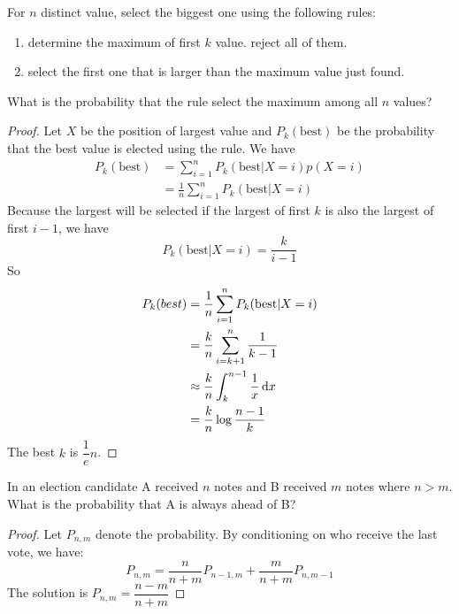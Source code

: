 \begin{example}
    For $n$ distinct value, select the biggest one using the following rules:
    \begin{enumerate}
        \item determine the maximum of first $k$ value. reject all of them.
        \item select the first one that is larger than the maximum value just found.
    \end{enumerate}
    What is the probability that the rule select the maximum among all $n$ values?
\end{example}
\begin{proof}
    Let $X$ be the position of largest value and $P_k(\text{best})$ be the probability that the best value is elected using the rule. We have
    \begin{equation*}
        \begin{aligned}
            P_k (\text{best}) &= \sum_{i=1}^n P_k (\text{best} | X = i) p(X=i) \\
            &= \frac{1}{n} \sum_{i=1}^n P_k (\text{best}|X=i)
        \end{aligned}
    \end{equation*}
    Because the largest will be selected if the largest of first $k$ is also the largest of first $i-1$, we have
    \begin{equation*}
        P_k(\text{best} | X=i) = \frac{k}{i-1}
    \end{equation*}
    So
    \begin{equation*}
        \begin{aligned}
            P_k(best) &= \frac{1}{n} \sum_{i=1}^n P_k (\text{best}|X=i) \\
            &= \frac{k}{n} \sum_{i=k+1}^n \frac{1}{k-1} \\
            &\approx \frac{k}{n} \int_k^{n-1} \frac{1}{x} \dif{x} \\
            &= \frac{k}{n} \log{\frac{n-1}{k}}
        \end{aligned}
    \end{equation*}
    The best $k$ is $\dfrac{1}{e} n$.
\end{proof}

\begin{example}
    In an election candidate A received $n$ notes and B received $m$ notes where $n > m$. What is the probability that A is always ahead of B?
\end{example}
\begin{proof}
    Let $P_{n,m}$ denote the probability. By conditioning on who receive the last vote, we have:
    \begin{equation*}
        P_{n,m} = \frac{n}{n+m} P_{n-1,m} + \frac{m}{n+m}P_{n,m-1}
    \end{equation*}    
    The solution is $P_{n,m} = \dfrac{n-m}{n+m}$
\end{proof}


